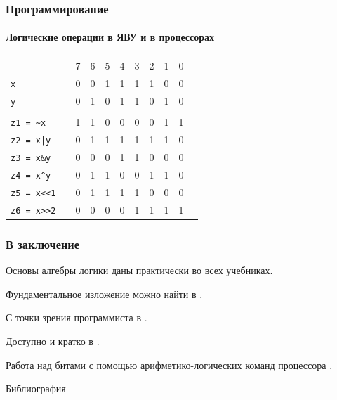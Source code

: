 \begin{frame}[fragile]
    \frametitle{Программирование}
    \framesubtitle{Логические операции в ЯВУ и в процессорах}
    
    \begin{center}
        \begin{tabular}{lcccccccccc}
                     &&\small{7}&\small{6}&\small{5}&\small{4}&\small{3}&\small{2}&\small{1}&\small{0}& \\ \cline{3-10}
            \verb"x"    &\multicolumn{1}{c|}{}  &0&0&1&1&1&1&0&0&\multicolumn{1}{|c}{}\\ \cline{3-10}
            \verb"y"    &\multicolumn{1}{c|}{}  &0&1&0&1&1&0&1&0&\multicolumn{1}{|c}{}\\ \cline{3-10}
            \\ \cline{3-10}
            \verb"z1 = ~x"   &\multicolumn{1}{c|}{}  &1&1&0&0&0&0&1&1&\multicolumn{1}{|c}{}\\ \cline{3-10}
            \verb"z2 = x|y"  &\multicolumn{1}{c|}{}  &0&1&1&1&1&1&1&0&\multicolumn{1}{|c}{}\\ \cline{3-10}
            \verb"z3 = x&y"  &\multicolumn{1}{c|}{}  &0&0&0&1&1&0&0&0&\multicolumn{1}{|c}{}\\ \cline{3-10}
            \verb"z4 = x^y"  &\multicolumn{1}{c|}{}  &0&1&1&0&0&1&1&0&\multicolumn{1}{|c}{}\\ \cline{3-10}
            \verb"z5 = x<<1" &\multicolumn{1}{c|}{}  &0&1&1&1&1&0&0&0&\multicolumn{1}{|c}{}\\ \cline{3-10}
            \verb"z6 = x>>2" &\multicolumn{1}{c|}{}  &0&0&0&0&1&1&1&1&\multicolumn{1}{|c}{}\\ \cline{3-10}
        \end{tabular}
    \end{center}
\end{frame}

\begin{frame}
    \frametitle{В заключение}
    
    Основы алгебры логики даны практически во всех учебниках.
    
    Фундаментальное изложение можно найти в \cite{bib:gorbatovs:discrmath, bib:yablonsky:discreteintro}.
    
    С точки зрения программиста в \cite{bib:novic:discrmathprogrammer, bib:haggard:discrmathprogrammer}.
    
    Доступно и кратко в \cite{bib:sudoplatov:discrmath}.
    
    Работа над битами с помощью арифметико-логических команд процессора \cite{bib:warren:algTriks}.
\end{frame}


\begin{frame}[allowframebreaks]{Библиография}
    
    
\end{frame}

